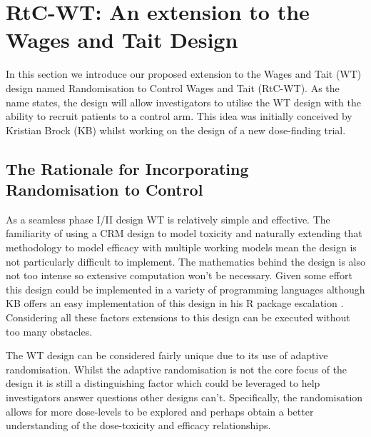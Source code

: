  \section{RtC-WT: An extension to the Wages and Tait Design}
 \label{WT:RtC-WT}
 
 In this section we introduce our proposed extension to the Wages and Tait (WT) design named Randomisation to Control Wages and Tait (RtC-WT). As the name states, the design will allow investigators to utilise the WT design with the ability to recruit patients to a control arm. This idea was initially conceived by Kristian Brock (KB) whilst working on the design of a new dose-finding trial.  
 
 \subsection{The Rationale for Incorporating Randomisation to Control}
 \label{WT:Rationale-for-RtC-WT}
 
 
As a seamless phase \RN{1}/\RN{2} design WT is relatively simple and effective. The familiarity of using a CRM design to model toxicity and naturally extending that methodology to model efficacy with multiple working models mean the design is not particularly difficult to implement. The mathematics behind the design is also not too intense so extensive computation won't be necessary. Given some effort this design could be implemented in a variety of programming languages although KB offers an easy implementation of this design in his R package escalation \cite{brockModularApproachDose2020}. Considering all these factors extensions to this design can be executed without too many obstacles.

The WT design can be considered fairly unique due to its use of adaptive randomisation. Whilst the adaptive randomisation is not the core focus of the design it is still a distinguishing factor which could be leveraged to help investigators answer questions other designs can't. Specifically, the randomisation allows for more dose-levels to be explored and perhaps obtain a better understanding of the dose-toxicity and efficacy relationships. 

